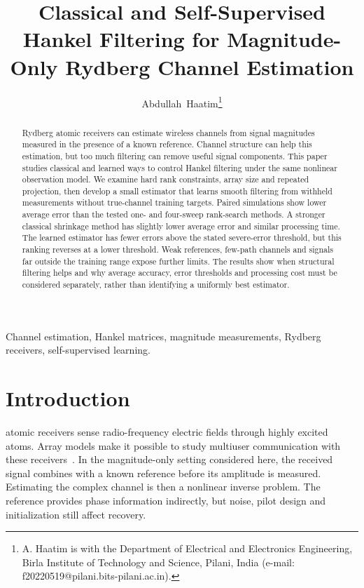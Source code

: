 \documentclass[10pt,journal,letterpaper]{IEEEtran}
\begin{document}
\title{Classical and Self-Supervised Hankel Filtering for Magnitude-Only Rydberg Channel Estimation}
\author{Abdullah~Haatim\thanks{A. Haatim is with the Department of Electrical and Electronics Engineering, Birla Institute of Technology and Science, Pilani, India (e-mail: f20220519@pilani.bits-pilani.ac.in).}}
\maketitle
\begin{abstract}
Rydberg atomic receivers can estimate wireless channels from signal magnitudes measured in the presence of a known reference. Channel structure can help this estimation, but too much filtering can remove useful signal components. This paper studies classical and learned ways to control Hankel filtering under the same nonlinear observation model. We examine hard rank constraints, array size and repeated projection, then develop a small estimator that learns smooth filtering from withheld measurements without true-channel training targets. Paired simulations show lower average error than the tested one- and four-sweep rank-search methods. A stronger classical shrinkage method has slightly lower average error and similar processing time. The learned estimator has fewer errors above the stated severe-error threshold, but this ranking reverses at a lower threshold. Weak references, few-path channels and signals far outside the training range expose further limits. The results show when structural filtering helps and why average accuracy, error thresholds and processing cost must be considered separately, rather than identifying a uniformly best estimator.
\end{abstract}
\begin{IEEEkeywords}
Channel estimation, Hankel matrices, magnitude measurements, Rydberg receivers, self-supervised learning.
\end{IEEEkeywords}

\section{Introduction}
 atomic receivers sense radio-frequency electric fields through highly excited atoms. Array models make it possible to study multiuser communication with these receivers~\cite{cui2025,gong2025mag}. In the magnitude-only setting considered here, the received signal combines with a known reference before its amplitude is measured. Estimating the complex channel is then a nonlinear inverse problem. The reference provides phase information indirectly, but noise, pilot design and initialization still affect recovery.
\end{document}
